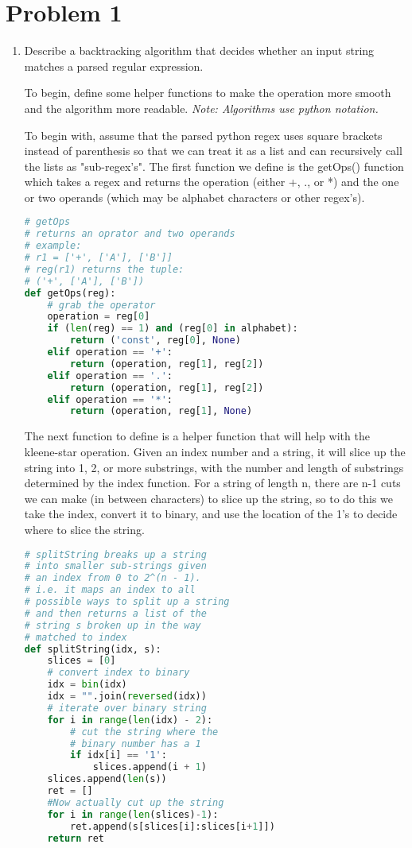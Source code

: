 \documentclass[11pt, letterpaper]{article}
\begin{document}
\section*{Problem 1}

\begin{enumerate}
\item Describe a backtracking algorithm that decides whether an input string matches a parsed regular expression. 

\quad To begin, define some helper functions to make the operation more smooth and the algorithm more readable. \textit{Note: Algorithms use python notation.}

\quad To begin with, assume that the parsed python regex uses square brackets instead of parenthesis so that we can treat it as a list and can recursively call the lists as "sub-regex's". The first function we define is the getOps() function which takes a regex and returns the operation (either +, ., or *) and the one or two operands (which may be alphabet characters or other regex's).

\begin{lstlisting}[language=python]
# getOps
# returns an oprator and two operands
# example: 
# r1 = ['+', ['A'], ['B']]
# reg(r1) returns the tuple:
# ('+', ['A'], ['B'])
def getOps(reg):
    # grab the operator
    operation = reg[0]
    if (len(reg) == 1) and (reg[0] in alphabet):
        return ('const', reg[0], None)
    elif operation == '+':
        return (operation, reg[1], reg[2])
    elif operation == '.':
        return (operation, reg[1], reg[2])
    elif operation == '*':
        return (operation, reg[1], None)
\end{lstlisting}

\pagebreak

\quad The next function to define is a helper function that will help with the kleene-star operation. Given an index number and a string, it will slice up the string into 1, 2, or more substrings, with the number and length of substrings determined by the index function. For a string of length n, there are n-1 cuts we can make (in between characters) to slice up the string, so to do this we take the index, convert it to binary, and use the location of the 1's to decide where to slice the string.

\begin{lstlisting}[language=python]
# splitString breaks up a string
# into smaller sub-strings given
# an index from 0 to 2^(n - 1).
# i.e. it maps an index to all
# possible ways to split up a string
# and then returns a list of the
# string s broken up in the way
# matched to index
def splitString(idx, s):
    slices = [0]
    # convert index to binary
    idx = bin(idx)
    idx = "".join(reversed(idx))
    # iterate over binary string
    for i in range(len(idx) - 2):
        # cut the string where the
        # binary number has a 1
        if idx[i] == '1':
            slices.append(i + 1)
    slices.append(len(s))
    ret = []
    #Now actually cut up the string
    for i in range(len(slices)-1):
        ret.append(s[slices[i]:slices[i+1]])
    return ret
\end{lstlisting}


\end{enumerate}
\end{document}
